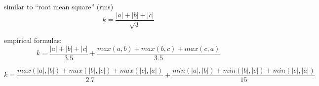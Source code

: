 \documentclass[unicode, 12pt, a4paper]{article}
\begin{document}
similar to ``root mean square'' (rms)
\begin{equation}
  k = \frac{|a| + |b| + |c|}{\sqrt{3}}
\end{equation}

empirical formulas:
\begin{equation}
  k = \frac{|a| + |b| + |c|}{3.5} + \frac{max(a, b) + max(b, c) + max(c, a)}{3.5}
\end{equation}

\begin{equation}
  k = \frac{max(|a|, |b|) + max(|b|, |c|) + max(|c|, |a|)}{2.7} + \frac{  min(|a|, |b|) + min(|b|, |c|) + min(|c|, |a|)}{15}
\end{equation}
\end{document}
